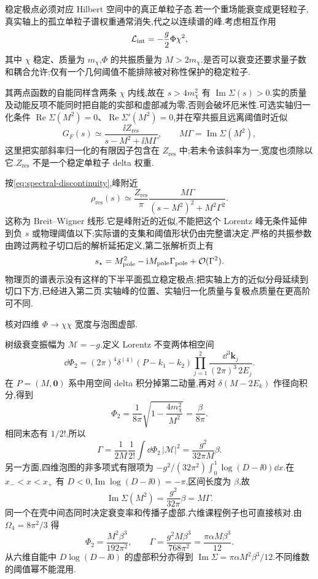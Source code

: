 稳定极点必须对应 Hilbert 空间中的真正单粒子态.若一个重场能衰变成更轻粒子,真实轴上的孤立单粒子谱权重通常消失,代之以连续谱的峰.考虑相互作用
\[
 \mathcal L_{\mathrm{int}}=-\frac g2\Phi\chi^2,
\]
其中 $\chi$ 稳定、质量为 $m_\chi$,$\Phi$ 的共振质量为 $M>2m_\chi$.是否可以衰变还要求量子数和耦合允许;仅有一个几何阈值不能排除被对称性保护的稳定粒子.

其两点函数的自能同样含两条 $\chi$ 内线,故在 $s>4m_\chi^2$ 有 $\operatorname{Im}\Sigma(s)>0$.实的质量及动能反项不能同时把自能的实部和虚部减为零,否则会破坏厄米性.可选实轴归一化条件 $\operatorname{Re}\Sigma(M^2)=0$、$\operatorname{Re}\Sigma'(M^2)=0$,并在窄共振且远离阈值时近似
\[
 G_F(s)\simeq\frac{\ii Z_{\mathrm{res}}}{s-M^2+\ii M\Gamma},\qquad
 M\Gamma=\operatorname{Im}\Sigma(M^2),
\]
这里把实部斜率归一化的有限因子包含在 $Z_{\mathrm{res}}$ 中;若未令该斜率为一,宽度也须除以它.$Z_{\mathrm{res}}$ 不是一个稳定单粒子 delta 权重.

按\eqref{eq:spectral-discontinuity},峰附近
\begin{equation}\label{eq:BW}
 \rho_{\mathrm{res}}(s)\simeq\frac{Z_{\mathrm{res}}}{\pi}
 \frac{M\Gamma}{(s-M^2)^2+M^2\Gamma^2}.
\end{equation}
这称为 Breit--Wigner 线形.它是峰附近的近似,不能把这个 Lorentz 峰无条件延伸到负 $s$ 或物理阈值以下;实际谱的支集和阈值形状仍由完整谱决定.严格的共振参数由跨过两粒子切口后的解析延拓定义,第二张解析页上有
\[
 s_\star=M_{\mathrm{pole}}^2-\mathrm i M_{\mathrm{pole}}\Gamma_{\mathrm{pole}}+\mathcal O(\Gamma^2).
\]
物理页的谱表示没有这样的下半平面孤立稳定极点;把实轴上方的近似分母延续到切口下方,已经进入第二页.实轴峰的位置、实轴归一化质量与复极点质量在更高阶可不同.

\begin{example}
核对四维 $\Phi\to\chi\chi$ 宽度与泡图虚部.
\end{example}
\begin{solution}
树级衰变振幅为 $\mathcal M=-g$.定义 Lorentz 不变两体相空间
\[
 \dd\Phi_2=(2\pi)^4\delta^{(4)}(P-k_1-k_2)
 \prod_{j=1}^2\frac{\dd^3\boldsymbol k_j}{(2\pi)^3\,2E_j}.
\]
在 $P=(M,\boldsymbol0)$ 系中用空间 delta 积分掉第二动量,再对 $\delta(M-2E_k)$ 作径向积分,得到
\[
 \Phi_2=\frac1{8\pi}\sqrt{1-\frac{4m_\chi^2}{M^2}}=\frac\beta{8\pi}.
\]
相同末态有 $1/2!$,所以
\[
 \Gamma=\frac1{2M}\frac1{2!}\int\dd\Phi_2\,|\mathcal M|^2
 =\frac{g^2}{32\pi M}\beta.
\]
另一方面,四维泡图的非多项式有限项为
$-g^2/(32\pi^2)\int_0^1\log(D-\ii0)\dd x$.在 $x_-<x<x_+$ 有 $D<0$,$\operatorname{Im}\log(D-\ii0)=-\pi$,区间长度为 $\beta$,故
\[
 \operatorname{Im}\Sigma(M^2)=\frac{g^2}{32\pi}\beta=M\Gamma.
\]
同一个在壳中间态同时决定衰变率和传播子虚部.六维课程例子也可直接核对.由 $\Omega_4=8\pi^2/3$ 得
\[
\Phi_2=\frac{M^2\beta^3}{192\pi^2},\qquad
\Gamma=\frac{g^2M\beta^3}{768\pi^2}=\frac{\pi\alpha M\beta^3}{12}.
\]
从六维自能中 $D\log(D-\ii0)$ 的虚部积分亦得到 $\operatorname{Im}\Sigma=\pi\alpha M^2\beta^3/12$.不同维数的阈值幂不能混用.
\end{solution}

